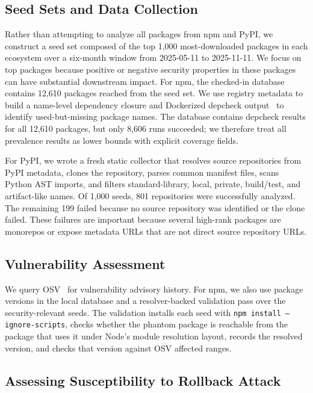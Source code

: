 \documentclass[letterpaper,twocolumn,10pt]{article}
\newcommand{\npm}{npm\xspace}
\newcommand{\pypi}{PyPI\xspace}
\newcommand{\osv}{OSV\xspace}
\begin{document}
\subsection{Seed Sets and Data Collection}

Rather than attempting to analyze all packages from \npm and \pypi, we
construct a seed set composed of the top 1,000 most-downloaded packages in each
ecosystem over a six-month window from 2025-05-11 to 2025-11-11.  We focus on
top packages because positive or negative security properties in these packages
can have substantial downstream impact.  For \npm, the checked-in database
contains 12,610 packages reached from the seed set.  We use registry metadata to
build a name-level dependency closure and Dockerized depcheck output~\cite{depcheck}
to identify used-but-missing package names.  The database contains depcheck
results for all 12,610 packages, but only 8,606 runs succeeded; we therefore
treat all prevalence results as lower bounds with explicit coverage fields.

For \pypi, we wrote a fresh static collector that resolves source repositories
from PyPI metadata, clones the repository, parses common manifest files, scans
Python AST imports, and filters standard-library, local, private, build/test,
and artifact-like names.  Of 1,000 seeds, 801 repositories were successfully
analyzed.  The remaining 199 failed because no source repository was identified
or the clone failed.  These failures are important because several high-rank
packages are monorepos or expose metadata URLs that are not direct source
repository URLs.

\subsection{Vulnerability Assessment}

We query \osv~\cite{osv} for vulnerability advisory history.  For \npm, we also
use package versions in the local database and a resolver-backed validation pass
over the security-relevant seeds.  The validation installs each seed with
\texttt{npm install --ignore-scripts}, checks whether the phantom package is
reachable from the package that uses it under Node's module resolution layout,
records the resolved version, and checks that version against OSV affected
ranges.

\subsection{Assessing Susceptibility to Rollback Attack}
\end{document}
